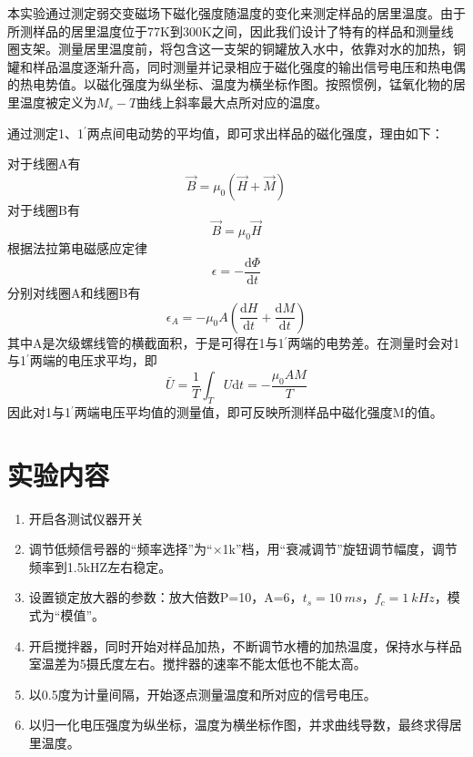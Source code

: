 \documentclass[a4paper]{article}
\begin{document}
本实验通过测定弱交变磁场下磁化强度随温度的变化来测定样品的居里温度。由于所测样品的居里温度位于77K到300K之间，因此我们设计了特有的样品和测量线圈支架。测量居里温度前，将包含这一支架的铜罐放入水中，依靠对水的加热，铜罐和样品温度逐渐升高，同时测量并记录相应于磁化强度的输出信号电压和热电偶的热电势值。以磁化强度为纵坐标、温度为横坐标作图。按照惯例，锰氧化物的居里温度被定义为$M_s - T$曲线上斜率最大点所对应的温度。

通过测定1、1$^{'}$两点间电动势的平均值，即可求出样品的磁化强度，理由如下：

对于线圈A有
\begin{equation*}
    \vec{B} = \mu_0(\vec{H}+\vec{M})
\end{equation*}
对于线圈B有
\begin{equation*}
    \vec{B} = \mu_0\vec{H}
\end{equation*}
根据法拉第电磁感应定律
\begin{equation*}
    \epsilon = -\frac{\text{d}\Phi}{\text{d}t}
\end{equation*}
分别对线圈A和线圈B有
\begin{equation*}
    \epsilon_A = -\mu_0A\left(\frac{\text{d}H}{\text{d}t} + \frac{\text{d}M}{\text{d}t}\right)
\end{equation*}
其中A是次级螺线管的横截面积，于是可得在1与1$^{'}$两端的电势差。在测量时会对1与1$^{'}$两端的电压求平均，即
\begin{equation*}
    \bar{U} = \frac{1}{T}\int_{T}U\text{d}t = -\frac{\mu_0AM}{T}
\end{equation*}
因此对1与1$^{'}$两端电压平均值的测量值，即可反映所测样品中磁化强度M的值。

\section{实验内容}
\begin{enumerate}
    \item 开启各测试仪器开关
    \item 调节低频信号器的“频率选择”为“$\times$1k”档，用“衰减调节”旋钮调节幅度，调节频率到1.5kHZ左右稳定。
    \item 设置锁定放大器的参数：放大倍数P=10，A=6，$ t_s = \SI{10}{ms} $，$ f_c = \SI{1}{kHz} $，模式为“模值”。
    \item 开启搅拌器，同时开始对样品加热，不断调节水槽的加热温度，保持水与样品室温差为5摄氏度左右。搅拌器的速率不能太低也不能太高。
    \item 以0.5度为计量间隔，开始逐点测量温度和所对应的信号电压。
    \item 以归一化电压强度为纵坐标，温度为横坐标作图，并求曲线导数，最终求得居里温度。
\end{enumerate}
\end{document}

